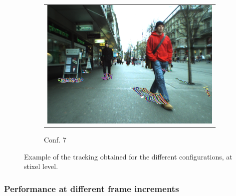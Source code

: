 \begin{figure}[t]
        ~
        \begin{subfigure}[b]{0.3\textwidth}
	  \begin{tabular}{c}
	    \includegraphics[width=\textwidth]{trackingConf7}
	  \end{tabular}
	  \caption{Conf. 7}\label{fig:cp04_tracking_example_conf_7}
        \end{subfigure}%
        \caption{Example of the tracking obtained for the different configurations, at stixel level.}\label{fig:cp04_tracking_examples}
\end{figure}

\subsubsection{Performance at different frame increments}\label{ch:chapter04_02_03_02}

